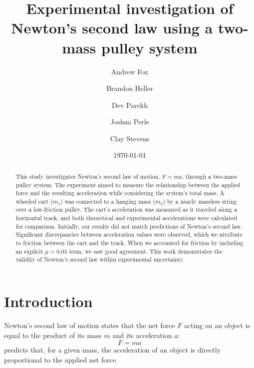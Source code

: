 \documentclass[reprint,amsmath,amssymb,aps,twoside]{revtex4-2}
\begin{document}
\setcounter{page}{27}
\title{Experimental investigation of Newton's second law using a two-mass pulley system}
\author{Andrew Fox}
\author{Brandon Heller}
\author{Dev Parekh}
\author{Joshua Perle}
\author{Clay Stevens}
\date{\today}

\begin{abstract}
This study investigates Newton’s second law of motion, $F = ma$, through a two-mass pulley system. The experiment aimed to measure the relationship between the applied force and the resulting acceleration while considering the system's total mass. A wheeled cart ($m_1$) was connected to a hanging mass ($m_2$) by a nearly massless string over a low-friction pulley. The cart’s acceleration was measured as it traveled along a horizontal track, and both theoretical and experimental accelerations were calculated for comparison. Initially, our results did not match predictions of Newton's second law. Significant discrepancies between acceleration values were observed, which we attribute to friction between the cart and the track. When we accounted for friction by including an explicit $\mu=0.03$ term, we saw good agreement. This work demonstrates the validity of Newton’s second law within experimental uncertainty.
\end{abstract}


\maketitle\thispagestyle{mytitlepage}






\section{Introduction}
Newton’s second law of motion states that the net force $F$ acting on an object is equal to the product of its mass $m$ and its acceleration $a$:
\begin{equation}
F = ma
\label{eq:1}
\end{equation}
 predicts that, for a given mass, the acceleration of an object is directly proportional to the applied net force. 
\end{document}
